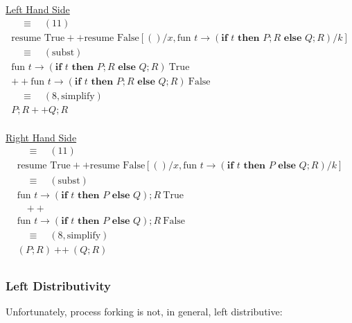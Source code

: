 \documentclass[logo,bsc,singlespacing,parskip]{infthesis}
\begin{document}
\underline{Left Hand Side}
\[
\begin{array}{l}

\quad\equiv\quad (11) \\[5pt]
\text{resume True} ++ \text{resume False} [()/x, \text{fun } t \rightarrow (\textbf{if } t \textbf{ then } P;R \textbf{ else } Q;R)/k] \\[5pt]
\quad\equiv\quad (\text{subst}) \\[5pt]
\text{fun } t \rightarrow (\textbf{if } t \textbf{ then } P;R \textbf{ else } Q;R)\ \text{True} \\[2pt]
 \mathbin{++} 
\text{fun } t \rightarrow (\textbf{if } t \textbf{ then } P;R \textbf{ else } Q;R)\ \text{False} \\[5pt]
\quad\equiv\quad (8, \text{simplify}) \\[5pt]
P;R  ++ Q;R \\[1em]
\end{array}
\]

\underline{Right Hand Side}
\[
\begin{array}{l}
\quad\equiv\quad (11) \\[5pt]
\text{resume True} ++ \text{resume False} [()/x, \text{fun } t \rightarrow (\textbf{if } t \textbf{ then } P \textbf{ else } Q;R) / k] \\[5pt]
\quad\equiv\quad (\text{subst}) \\[5pt]
\text{fun } t \rightarrow (\textbf{if } t \textbf{ then } P \textbf{ else } Q);R\ \text{True} \\[2pt]
\quad \mathbin{++} \\
\text{fun } t \rightarrow (\textbf{if } t \textbf{ then } P \textbf{ else } Q);R\ \text{False} \\[5pt]
\quad\equiv\quad (8, \text{simplify}) \\[5pt]
(P;R) \: \text{++} \:(Q;R) \\[5pt]
\end{array}
\]


\subsubsection*{Left Distributivity}

Unfortunately, process forking is not, in general, left distributive:
\end{document}
